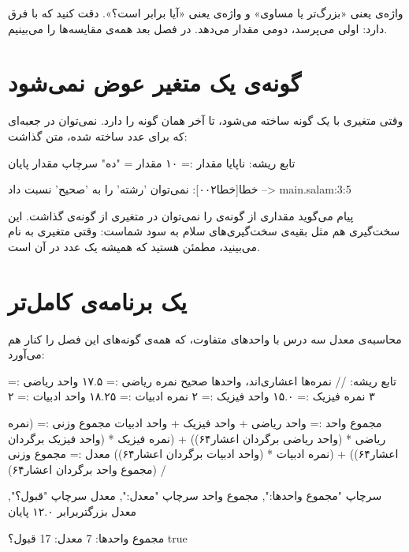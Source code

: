 واژه‌ی  یعنی «بزرگ‌تر یا مساوی» و واژه‌ی 
یعنی «آیا برابر است؟». دقت کنید که  با \code{=} فرق دارد: اولی
می‌پرسد، دومی مقدار می‌دهد. در فصل بعد همه‌ی مقایسه‌ها را می‌بینیم.

\section{گونه‌ی یک متغیر عوض نمی‌شود}

وقتی متغیری با یک گونه ساخته می‌شود، تا آخر همان گونه را دارد. نمی‌توان در
جعبه‌ای که برای عدد ساخته شده، متن گذاشت:

\begin{salamfa}
تابع ریشه:
    ناپایا مقدار := ۱۰
    مقدار = "ده"
    سرچاپ مقدار
پایان
\end{salamfa}

\begin{outputfa}
خطا[خطا۰۰۲]: نمی‌توان 'رشته' را به 'صحیح' نسبت داد
 --> main.salam:3:5
\end{outputfa}

پیام می‌گوید مقداری از گونه‌ی  را نمی‌توان در متغیری از گونه‌ی
 گذاشت. این سخت‌گیری هم مثل
بقیه‌ی سخت‌گیری‌های سلام به سود شماست: وقتی متغیری به نام 
می‌بینید، مطمئن هستید که همیشه یک عدد در آن است.

\section{یک برنامه‌ی کامل‌تر}

محاسبه‌ی معدل سه درس با واحدهای متفاوت، که همه‌ی گونه‌های این فصل را کنار
هم می‌آورد:

\begin{salamfa}
تابع ریشه:
    // نمره‌ها اعشاری‌اند، واحدها صحیح
    نمره ریاضی := ۱۷.۵
    واحد ریاضی := ۳
    نمره فیزیک := ۱۵.۰
    واحد فیزیک := ۲
    نمره ادبیات := ۱۸.۲۵
    واحد ادبیات := ۲

    مجموع واحد := واحد ریاضی + واحد فیزیک + واحد ادبیات
    مجموع وزنی := (نمره ریاضی * (واحد ریاضی برگردان اعشار۶۴)) +
                  (نمره فیزیک * (واحد فیزیک برگردان اعشار۶۴)) +
                  (نمره ادبیات * (واحد ادبیات برگردان اعشار۶۴))
    معدل := مجموع وزنی / (مجموع واحد برگردان اعشار۶۴)

    سرچاپ "مجموع واحدها:", مجموع واحد
    سرچاپ "معدل:", معدل
    سرچاپ "قبول؟", معدل بزرگتربرابر ۱۲.۰
پایان
\end{salamfa}

\begin{outputfa}
مجموع واحدها: 7
معدل: 17
قبول؟ true
\end{outputfa}

